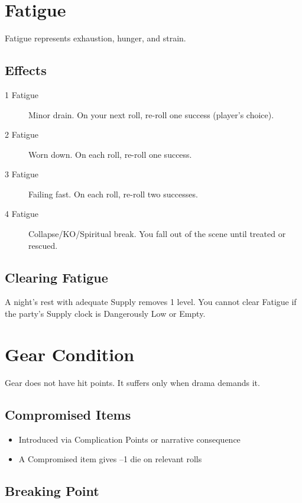 \section{Fatigue}

Fatigue represents exhaustion, hunger, and strain.

\subsection{Effects}

\begin{description}
\item[1 Fatigue] Minor drain. On your next roll, re-roll one success (player's choice).
\item[2 Fatigue] Worn down. On each roll, re-roll one success.
\item[3 Fatigue] Failing fast. On each roll, re-roll two successes.
\item[4 Fatigue] Collapse/KO/Spiritual break. You fall out of the scene until treated or rescued.
\end{description}

\subsection{Clearing Fatigue}

A night's rest with adequate Supply removes 1 level. You cannot clear Fatigue if the party's Supply clock is Dangerously Low or Empty.

\section{Gear Condition}

Gear does not have hit points. It suffers only when drama demands it.

\subsection{Compromised Items}

\begin{itemize}
\item Introduced via Complication Points or narrative consequence
\item A Compromised item gives --1 die on relevant rolls
\end{itemize}

\subsection{Breaking Point}

